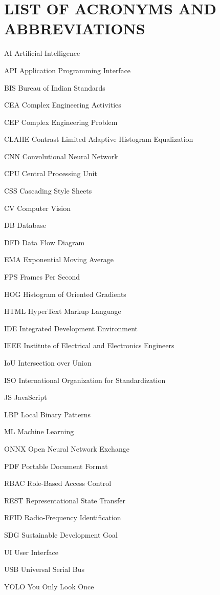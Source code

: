 \documentclass[10pt]{report}
\begin{document}
\chapter*{LIST OF ACRONYMS AND ABBREVIATIONS}
\begin{abbrv}
\item[AI] Artificial Intelligence
\item[API] Application Programming Interface
\item[BIS] Bureau of Indian Standards
\item[CEA] Complex Engineering Activities
\item[CEP] Complex Engineering Problem
\item[CLAHE] Contrast Limited Adaptive Histogram Equalization
\item[CNN] Convolutional Neural Network
\item[CPU] Central Processing Unit
\item[CSS] Cascading Style Sheets
\item[CV] Computer Vision
\item[DB] Database
\item[DFD] Data Flow Diagram
\item[EMA] Exponential Moving Average
\item[FPS] Frames Per Second
\item[HOG] Histogram of Oriented Gradients
\item[HTML] HyperText Markup Language
\item[IDE] Integrated Development Environment
\item[IEEE] Institute of Electrical and Electronics Engineers
\item[IoU] Intersection over Union
\item[ISO] International Organization for Standardization
\item[JS] JavaScript
\item[LBP] Local Binary Patterns
\item[ML] Machine Learning
\item[ONNX] Open Neural Network Exchange
\item[PDF] Portable Document Format
\item[RBAC] Role-Based Access Control
\item[REST] Representational State Transfer
\item[RFID] Radio-Frequency Identification
\item[SDG] Sustainable Development Goal
\item[UI] User Interface
\item[USB] Universal Serial Bus
\item[YOLO] You Only Look Once
\end{abbrv}
\end{document}
